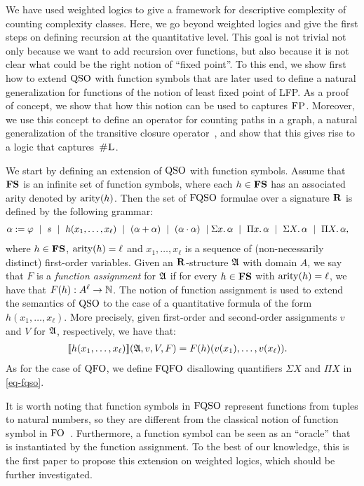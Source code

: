 
We have used weighted logics to give a framework for descriptive complexity of counting complexity classes. Here, we go beyond weighted logics and give the first steps on defining recursion at the quantitative level.
This goal is not trivial not only because we want to add recursion over functions, but also because 
it is not clear what could be the right notion of ``fixed point''. 
To this end, we show first how to extend ${\rm QSO}$ with function symbols that are later
used 
to define a natural generalization for functions of 
the notion of least fixed point of LFP.
 As a proof of concept, we show that how this notion can be used to captures $\text{\sc FP}$.
Moreover, we use this concept
to define an operator for counting paths in a graph, a natural generalization of the transitive closure operator~\cite{immerman1999descriptive}, and show that this gives rise to a logic that captures~$\text{\sc \#L}$. 

We start by defining an extension of ${\rm QSO}$ with function symbols. Assume that $\mathbf{FS}$ is an infinite set of function symbols, where each $h \in \mathbf{FS}$ has an associated arity denoted by ${\rm arity}(h)$. Then the set of ${\rm FQSO}$ formulae over a signature $\mathbf{R}$ is defined by the following grammar:
\begin{align}
\label{eq-fqso}
	\alpha &:= \varphi \ \mid \  s \  \mid \  h(x_1, \ldots, x_\ell) \  \mid \
	(\alpha + \alpha) \  \mid\  (\alpha \cdot \alpha) \  \mid 
	\Sigma{x}.\, \alpha \  \mid \
	\Pi{x}.\, \alpha \  \mid \
	\Sigma{X}.\, \alpha \  \mid \
	\Pi{X}.\, \alpha,
\end{align}
where $h \in \mathbf{FS}$, ${\rm arity}(h) = \ell$ and $x_1, \ldots, x_\ell$ is a sequence of (non-necessarily distinct) first-order variables. Given an $\mathbf{R}$-structure $\mathfrak{A}$ with domain $A$, we say that $F$ is a \emph{function assignment} for $\mathfrak{A}$ if for every $h \in \mathbf{FS}$ with ${\rm arity}(h) = \ell$, we have that $F(h) :  A^\ell \to \mathbb{N}$. The notion of function assignment is used to extend the semantics of ${\rm QSO}$ to the case of a quantitative formula of the form $h(x_1, \ldots, x_\ell)$. More precisely, given first-order and second-order assignments $v$ and $V$ for $\mathfrak{A}$, respectively, 
we have that:
\begin{align*}
{\llbracket{}{h(x_1, \ldots, x_\ell)}\rrbracket}(\mathfrak{A},v,V,F) &= F(h)(v(x_1),\ldots, v(x_\ell)).
\end{align*}
As for the case of ${\rm QFO}$, we define ${\rm FQFO}$ disallowing quantifiers $\Sigma X$ and $\Pi X$ in \eqref{eq-fqso}.

It is worth noting that function symbols in ${\rm FQSO}$ represent functions from tuples to natural numbers, so they are different from the classical notion of function symbol in ${\rm FO}$~\cite{L04}. 
Furthermore, a function symbol can be seen as an ``oracle'' that is instantiated by the function assignment. 
To the best of our knowledge, this is the first paper to propose this extension on weighted logics, which should be further investigated. 

